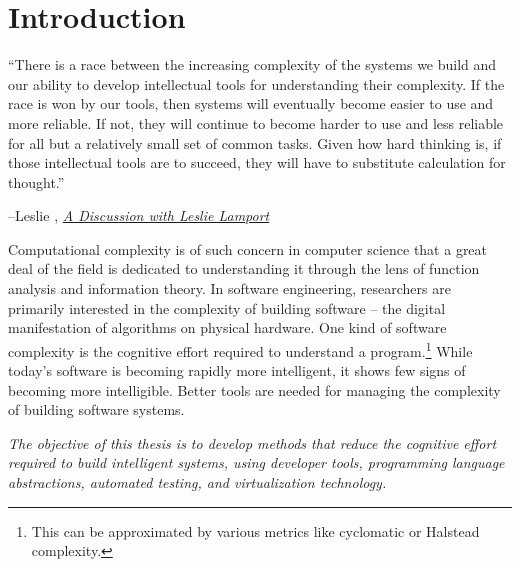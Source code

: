\chapter{Introduction}\label{ch:introduction}

\setlength{\epigraphwidth}{0.85\textwidth}
\epigraph{``There is a race between the increasing complexity of the systems we build and our ability to develop intellectual tools for understanding their complexity. If the race is won by our tools, then systems will eventually become easier to use and more reliable. If not, they will continue to become harder to use and less reliable for all but a relatively small set of common tasks. Given how hard thinking is, if those intellectual tools are to succeed, they will have to substitute calculation for thought.''}{\begin{flushright}--Leslie \citet{lamport2002discussion}, \href{https://www.microsoft.com/en-us/research/uploads/prod/2016/12/A-Discussion-With-Leslie-Lamport.pdf}{\textit{A Discussion with Leslie Lamport}}\end{flushright}}

Computational complexity is of such concern in computer science that a great deal of the field is dedicated to understanding it through the lens of function analysis and information theory. In software engineering, researchers are primarily interested in the complexity of building software -- the digital manifestation of algorithms on physical hardware. One kind of software complexity is the cognitive effort required to understand a program.\hspace{-.08em}\footnote{This can be approximated by various metrics like cyclomatic or Halstead complexity.} While today's software is becoming rapidly more intelligent, it shows few signs of becoming more intelligible. Better tools are needed for managing the complexity of building software systems.

\textit{The objective of this thesis is to develop methods that reduce the cognitive effort required to build intelligent systems, using developer tools, programming language abstractions, automated testing, and virtualization technology.}

